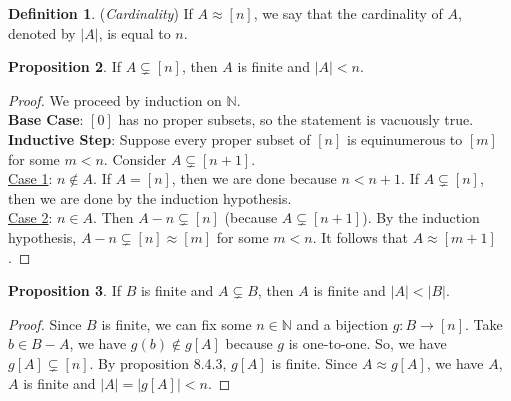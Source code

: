 \documentclass[14pt]{article}
\theoremstyle{definition}
\newtheorem{definition}{Definition}[subsection]
\newtheorem{proposition}[definition]{Proposition}
\newcommand{\fun}[3]{#1\colon #2\rightarrow#3}
\newcommand{\bb}[1]{\mathbb{#1}}
\begin{document}
\begin{definition}
   (\textit{Cardinality}) If $A\approx [n]$, we say that the cardinality of $A$, denoted by $|A|$, is equal to $n$.
\end{definition}

\vspace{2mm}

\begin{proposition}
    If $A\subsetneq [n]$, then $A$ is finite and $|A|<n$.
\end{proposition}

\begin{proof}
    We proceed by induction on $\bb{N}$.\\
    \textbf{Base Case}: $[0]$ has no proper subsets, so the statement is vacuously true.\\
    \textbf{Inductive Step}: Suppose every proper subset of $[n]$ is equinumerous to $[m]$ for 
    some $m<n$. Consider $A\subsetneq [n+1]$. \\
    \underline{Case 1}: $n\not\in A$. If $A=[n]$, then we are done because $n<n+1$. If 
    $A\subsetneq [n]$, then we are done by the induction hypothesis.\\
    \underline{Case 2}: $n\in A$. Then $A-{n}\subsetneq [n]$ (because $A\subsetneq [n+1]$). By 
    the induction hypothesis, $A-{n}\subsetneq [n]\approx [m]$ for some $m<n$. It follows that
    $A\approx [m+1]$. 

 \end{proof}
 
 \vspace{2mm}

\begin{proposition}
    If $B$ is finite and $A\subsetneq B$, then $A$ is finite and $|A|<|B|$.
\end{proposition}
\begin{proof}
    Since $B$ is finite, we can fix some $n\in \bb{N}$ and a bijection $\fun{g}{B}{[n]}$.
    Take $b\in B-A$, we have $g(b)\not\in g[A]$ because $g$ is one-to-one. 
    So, we have $g[A]\subsetneq [n]$. By proposition 8.4.3, $g[A]$ is finite. Since $A\approx g[A]$,
    we have $A$, $A$ is finite and $|A|=|g[A]|<n$.
\end{proof}

\vspace{2mm}
\end{document}
